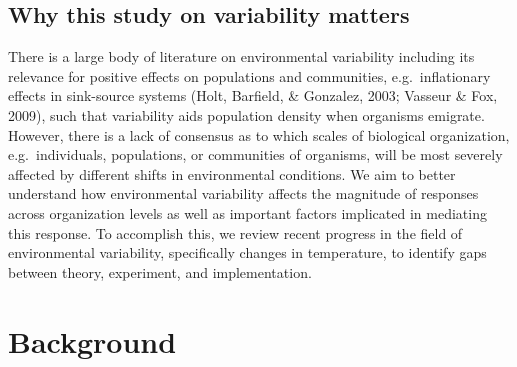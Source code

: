 \documentclass[12pt,twoside]{reedthesis}
\begin{document}
\hypertarget{why-this-study-on-variability-matters}{%
\section{Why this study on variability matters}\label{why-this-study-on-variability-matters}}

There is a large body of literature on environmental variability including its relevance for positive effects on populations and communities, e.g.~inflationary effects in sink-source systems (Holt, Barfield, \& Gonzalez, 2003; Vasseur \& Fox, 2009), such that variability aids population density when organisms emigrate. However, there is a lack of consensus as to which scales of biological organization, e.g.~individuals, populations, or communities of organisms, will be most severely affected by different shifts in environmental conditions. We aim to better understand how environmental variability affects the magnitude of responses across organization levels as well as important factors implicated in mediating this response. To accomplish this, we review recent progress in the field of environmental variability, specifically changes in temperature, to identify gaps between theory, experiment, and implementation.

\hypertarget{background}{%
\chapter{Background}\label{background}}
\end{document}
